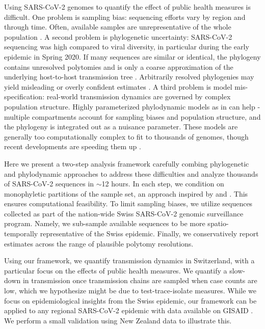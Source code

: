 \documentclass[9pt,twoside,lineno]{pnas-new} %
\begin{document}
Using SARS-CoV-2 genomes to quantify the effect of public health measures is difficult. One problem is sampling bias: sequencing efforts vary by region and through time. Often, available samples are unrepresentative of the whole population \cite{Villabona-Arenas2020, DeMaio2015}. A second problem is phylogenetic uncertainty: SARS-CoV-2 sequencing was high compared to viral diversity, in particular during the early epidemic in Spring 2020. If many sequences are similar or identical, the phylogeny contains unresolved polytomies and is only a coarse approximation of the underlying host-to-host transmission tree \cite{Villabona-Arenas2020}. Arbitrarily resolved phylogenies may yield misleading or overly confident estimates \cite{Morel2021}. A third problem is model mis-specification: real-world transmission dynamics are governed by complex population structure. Highly parameterized phylodynamic models as in \cite{Miller2020, Geoghegan2020a, Muller2020a} can help - multiple compartments account for sampling biases and population structure, and the phylogeny is integrated out as a nuisance parameter. These models are generally too computationally complex to fit to thousands of genomes, though recent developments are speeding them up \cite{Lemey2021}. 

Here we present a two-step analysis framework carefully combing phylogenetic and phylodynamic approaches to  address these difficulties and analyze thousands of SARS-CoV-2 sequences in $\sim$12 hours. In each step, we condition on monophyletic partitions of the sample set, an approach inspired by  \cite{Muller2020} and \cite{DuPlessis}. This ensures computational feasibility. To limit sampling biases, we utilize sequences collected as part of the nation-wide Swiss SARS-CoV-2 genomic surveillance program. Namely, we sub-sample  available sequences to be more spatio-temporally representative of the Swiss epidemic. Finally, we conservatively report estimates across the range of plausible polytomy resolutions.

Using our framework, we quantify transmission dynamics in Switzerland, with a particular focus on the effects of public health measures. We quantify a slow-down in transmission once transmission chains are sampled when case counts are low, which we hypothesize might be due to test-trace-isolate measures. While we focus on epidemiological insights from the Swiss epidemic, our framework can be applied to any regional SARS-CoV-2 epidemic with data available on GISAID \cite{GISAID}. We perform a small validation using New Zealand data to illustrate this. 
\end{document}
